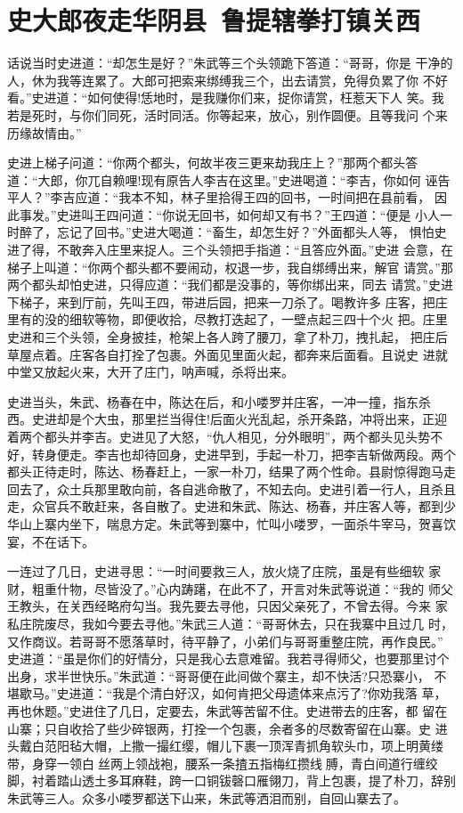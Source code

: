 \chapter{史大郎夜走华阴县~鲁提辖拳打镇关西}

话说当时史进道：“却怎生是好？”朱武等三个头领跪下答道：“哥哥，你是
干净的人，休为我等连累了。大郎可把索来绑缚我三个，出去请赏，免得负累了你
不好看。”史进道：“如何使得!恁地时，是我赚你们来，捉你请赏，枉惹天下人
笑。我若是死时，与你们同死，活时同活。你等起来，放心，别作圆便。且等我问
个来历缘故情由。”

史进上梯子问道：“你两个都头，何故半夜三更来劫我庄上？”那两个都头答
道：“大郎，你兀自赖哩!现有原告人李吉在这里。”史进喝道：“李吉，你如何
诬告平人？”李吉应道：“我本不知，林子里拾得王四的回书，一时间把在县前看，
因此事发。”史进叫王四问道：“你说无回书，如何却又有书？”王四道：“便是
小人一时醉了，忘记了回书。”史进大喝道：“畜生，却怎生好？”外面都头人等，
惧怕史进了得，不敢奔入庄里来捉人。三个头领把手指道：“且答应外面。”史进
会意，在梯子上叫道：“你两个都头都不要闹动，权退一步，我自绑缚出来，解官
请赏。”那两个都头却怕史进，只得应道：“我们都是没事的，等你绑出来，同去
请赏。”史进下梯子，来到厅前，先叫王四，带进后园，把来一刀杀了。喝教许多
庄客，把庄里有的没的细软等物，即便收拾，尽教打迭起了，一壁点起三四十个火
把。庄里史进和三个头领，全身披挂，枪架上各人跨了腰刀，拿了朴刀，拽扎起，
把庄后草屋点着。庄客各自打拴了包裹。外面见里面火起，都奔来后面看。且说史
进就中堂又放起火来，大开了庄门，呐声喊，杀将出来。

史进当头，朱武、杨春在中，陈达在后，和小喽罗并庄客，一冲一撞，指东杀
西。史进却是个大虫，那里拦当得住!后面火光乱起，杀开条路，冲将出来，正迎
着两个都头并李吉。史进见了大怒，“仇人相见，分外眼明”，两个都头见头势不
好，转身便走。李吉也却待回身，史进早到，手起一朴刀，把李吉斩做两段。两个
都头正待走时，陈达、杨春赶上，一家一朴刀，结果了两个性命。县尉惊得跑马走
回去了，众土兵那里敢向前，各自逃命散了，不知去向。史进引着一行人，且杀且
走，众官兵不敢赶来，各自散了。史进和朱武、陈达、杨春，并庄客人等，都到少
华山上寨内坐下，喘息方定。朱武等到寨中，忙叫小喽罗，一面杀牛宰马，贺喜饮
宴，不在话下。

一连过了几日，史进寻思：“一时间要救三人，放火烧了庄院，虽是有些细软
家财，粗重什物，尽皆没了。”心内踌躇，在此不了，开言对朱武等说道：“我的
师父王教头，在关西经略府勾当。我先要去寻他，只因父亲死了，不曾去得。今来
家私庄院废尽，我如今要去寻他。”朱武三人道：“哥哥休去，只在我寨中且过几
时，又作商议。若哥哥不愿落草时，待平静了，小弟们与哥哥重整庄院，再作良民。”
史进道：“虽是你们的好情分，只是我心去意难留。我若寻得师父，也要那里讨个
出身，求半世快乐。”朱武道：“哥哥便在此间做个寨主，却不快活?只恐寨小，
不堪歇马。”史进道：“我是个清白好汉，如何肯把父母遗体来点污了?你劝我落
草，再也休题。”史进住了几日，定要去，朱武等苦留不住。史进带去的庄客，都
留在山寨；只自收拾了些少碎银两，打拴一个包裹，余者多的尽数寄留在山寨。史
进头戴白范阳毡大帽，上撒一撮红缨，帽儿下裹一顶浑青抓角软头巾，项上明黄缕
带，身穿一领白丝两上领战袍，腰系一条揸五指梅红攒线膊，青白间道行缠绞
脚，衬着踏山透土多耳麻鞋，跨一口铜钹磬口雁翎刀，背上包裹，提了朴刀，辞别
朱武等三人。众多小喽罗都送下山来，朱武等洒泪而别，自回山寨去了。


